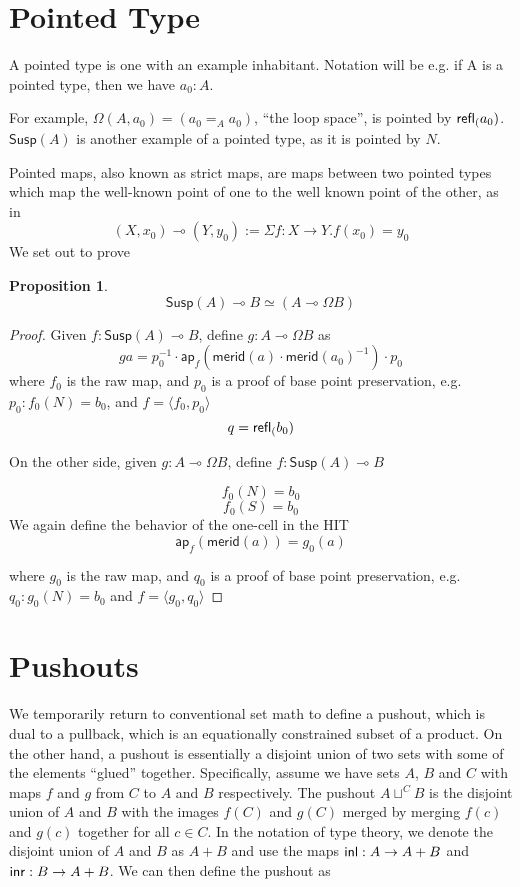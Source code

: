 \documentclass[11pt]{article}
\newcommand{\lolli}{\multimap}
\newcommand*{\ap}{\mathsf{ap}}
\newcommand{\merid}{\mathsf{merid}}
\newcommand{\susp}[1]{\mathsf{Susp}(#1)}
\newtheorem{proposition}{Proposition}
\begin{document}
\section{Pointed Type}
A pointed type is one with an example inhabitant. Notation will be e.g. if A is a pointed type, then we have $a_0 : A$.

For example, $\Omega(A, a_0) = (a_0 =_A a_0)$, ``the loop space'', is pointed by $\mathsf{refl}_{(} a_0)$. $\susp{A}$ is another example of a pointed type, as it is pointed by $N$.

Pointed maps, also known as strict maps, are maps between two pointed types which map the well-known point of one to the well known point of the other, as in
$$(X, x_0) \lolli (Y, y_0) := \Sigma f : X \to Y . f(x_0) = y_0$$
We set out to prove
\begin{proposition}
$$\susp{A} \lolli B \simeq (A \lolli \Omega B)$$
\end{proposition}
\begin{proof}
Given $f : \susp{A} \lolli B$, define $g : A \lolli \Omega B$ as
$$g a = p_0^{-1} \cdot \ap_f(\merid(a) \cdot \merid(a_0)^{-1}) \cdot p_0$$
where $f_0$ is the raw map, and $p_0$ is a proof of base point preservation, e.g. $p_0 : f_0(N) = b_0$, and $f = \langle f_0, p_0\rangle$
$$q = \mathsf{refl}_{(} b_0)$$

On the other side, given $g : A \lolli \Omega B$, define $f : \susp{A} \lolli B$

$$f_0(N) = b_0$$
$$f_0(S) = b_0$$
We again define the behavior of the one-cell in the HIT
$$\ap_f(\merid(a)) = g_0(a)$$

where $g_0$ is the raw map, and $q_0$ is a proof of base point preservation, e.g. $q_0 : g_0(N) = b_0$ and $f = \langle g_0, q_0\rangle$
\end{proof}

\section{Pushouts}
We temporarily return to conventional set math to define a pushout, which is
dual to a pullback, which is an equationally constrained subset of a product.
On the other hand, a pushout is essentially a disjoint union of two sets 
with some of the elements ``glued'' together. Specifically, assume we have
sets $A$, $B$ and $C$ with maps $f$ and $g$ from $C$ to $A$ and $B$ 
respectively. The pushout 
$A \sqcup^C B$ is the disjoint union of $A$ and $B$ with the images $f(C)$ and
$g(C)$ merged by merging $f(c)$ and $g(c)$ together for all $c \in C$. In the
notation of type theory, we denote the disjoint union of $A$ and $B$ as 
$A + B$ and use the maps ${\mathsf{inl}}: A \to A + B$ and ${\mathsf{inr}}: B \to A + B$. We
can then define the pushout as
\end{document}
